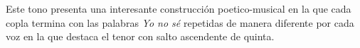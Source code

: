 Este tono presenta una interesante construcción poetico-musical en la que cada copla termina con las palabras \textit{Yo no sé} repetidas de manera diferente por cada voz en la que destaca el tenor con salto ascendente de quinta.
